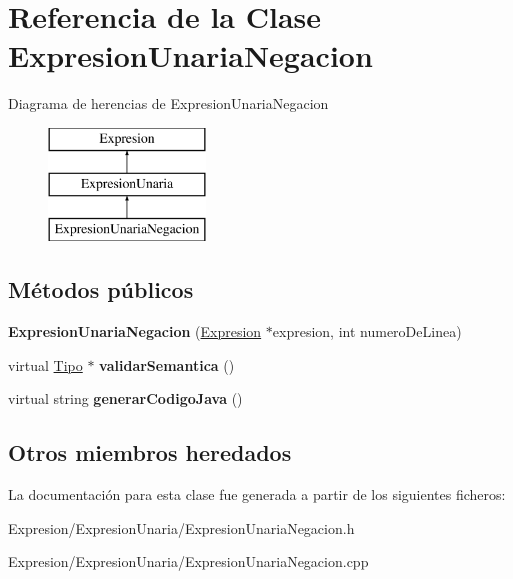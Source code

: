 \hypertarget{class_expresion_unaria_negacion}{\section{Referencia de la Clase Expresion\-Unaria\-Negacion}
\label{class_expresion_unaria_negacion}
}
Diagrama de herencias de Expresion\-Unaria\-Negacion\begin{figure}[H]
\begin{center}
\leavevmode
\includegraphics[height=3.000000cm]{class_expresion_unaria_negacion}
\end{center}
\end{figure}
\subsection*{Métodos públicos}
\begin{DoxyCompactItemize}
\item 
\hypertarget{class_expresion_unaria_negacion_aada4302b36facccbae7293378bf8c57d}{{\bfseries Expresion\-Unaria\-Negacion} (\hyperlink{class_expresion}{Expresion} $\ast$expresion, int numero\-De\-Linea)}\label{class_expresion_unaria_negacion_aada4302b36facccbae7293378bf8c57d}

\item 
\hypertarget{class_expresion_unaria_negacion_a23d0730b5c388fac4fc7f61744d0933d}{virtual \hyperlink{class_tipo}{Tipo} $\ast$ {\bfseries validar\-Semantica} ()}\label{class_expresion_unaria_negacion_a23d0730b5c388fac4fc7f61744d0933d}

\item 
\hypertarget{class_expresion_unaria_negacion_a27678c55ab7dbdfc59c9c83b60c970c4}{virtual string {\bfseries generar\-Codigo\-Java} ()}\label{class_expresion_unaria_negacion_a27678c55ab7dbdfc59c9c83b60c970c4}

\end{DoxyCompactItemize}
\subsection*{Otros miembros heredados}


La documentación para esta clase fue generada a partir de los siguientes ficheros\-:\begin{DoxyCompactItemize}
\item 
Expresion/\-Expresion\-Unaria/Expresion\-Unaria\-Negacion.\-h\item 
Expresion/\-Expresion\-Unaria/Expresion\-Unaria\-Negacion.\-cpp\end{DoxyCompactItemize}
